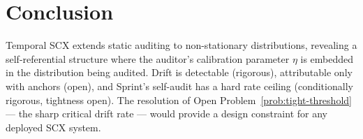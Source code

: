 \documentclass[12pt,a4paper]{article}
\begin{document}
\section{Conclusion}

Temporal SCX extends static auditing to non-stationary distributions,
revealing a self-referential structure where the auditor's calibration
parameter $\eta$ is embedded in the distribution being audited.  Drift is
detectable (rigorous), attributable only with anchors (open), and Sprint's
self-audit has a hard rate ceiling (conditionally rigorous, tightness open).
The resolution of Open Problem~\ref{prob:tight-threshold} --- the sharp
critical drift rate --- would provide a design constraint for any deployed
SCX system.


\end{document}
